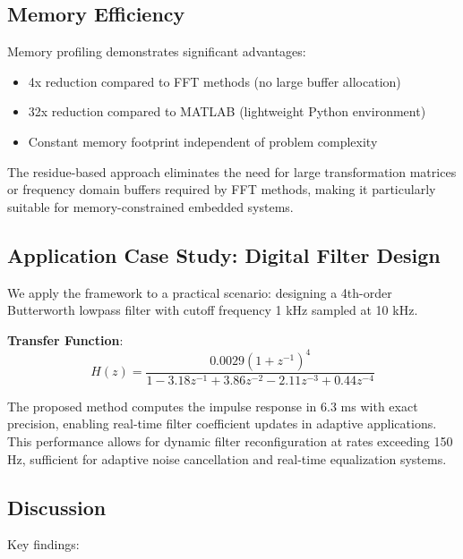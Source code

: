 \documentclass[conference]{IEEEtran}
\begin{document}
\subsection{Memory Efficiency}

Memory profiling demonstrates significant advantages:

\begin{itemize}
    \item 4x reduction compared to FFT methods (no large buffer allocation)
    \item 32x reduction compared to MATLAB (lightweight Python environment)
    \item Constant memory footprint independent of problem complexity
\end{itemize}

The residue-based approach eliminates the need for large transformation matrices or frequency domain buffers required by FFT methods, making it particularly suitable for memory-constrained embedded systems.

\subsection{Application Case Study: Digital Filter Design}

We apply the framework to a practical scenario: designing a 4th-order Butterworth lowpass filter with cutoff frequency 1 kHz sampled at 10 kHz.

\textbf{Transfer Function}:
\begin{equation}
H(z) = \frac{0.0029(1+z^{-1})^4}{1 - 3.18z^{-1} + 3.86z^{-2} - 2.11z^{-3} + 0.44z^{-4}}
\end{equation}

The proposed method computes the impulse response in 6.3 ms with exact precision, enabling real-time filter coefficient updates in adaptive applications. This performance allows for dynamic filter reconfiguration at rates exceeding 150 Hz, sufficient for adaptive noise cancellation and real-time equalization systems.

\subsection{Discussion}

Key findings:
\end{document}
